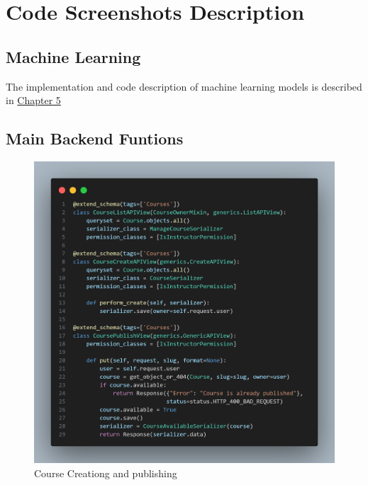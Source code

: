 \section{Code Screenshots Description}

\FloatBarrier
\subsection{Machine Learning}
The implementation and code description of machine learning models is described in \hyperref[ch:modeling]{Chapter 5}

\newpage

\FloatBarrier
\subsection{Main Backend Funtions}

\begin{figure}[h!]
	\centering
	\includegraphics[max height=\textheight,max width=\textwidth]{figures/srccode/code.png}
	\caption{Course Creationg and publishing}
\end{figure}

